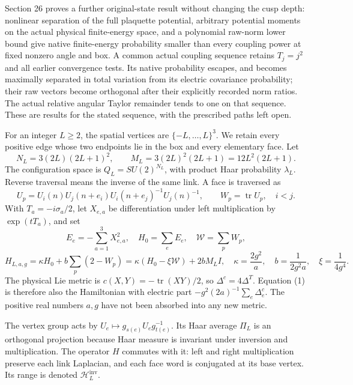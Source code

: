 \documentclass[
  11pt,
]{article}
\begin{document}
Section 26 proves a further original-state result without changing the
cusp depth: nonlinear separation of the full plaquette potential,
arbitrary potential moments on the actual physical finite-energy space,
and a polynomial raw-norm lower bound give native finite-energy
probability smaller than every coupling power at fixed nonzero angle and
box. A common actual coupling sequence retains \(T_j=j^2\) and all
earlier convergence tests. Its native probability escapes, and becomes
maximally separated in total variation from its electric covariance
probability; their raw vectors become orthogonal after their explicitly
recorded norm ratios. The actual relative angular Taylor remainder tends
to one on that sequence. These are results for the stated sequence, with
the prescribed paths left open.

For an integer \(L\ge2\), the spatial vertices are
\(\{-L,\ldots,L\}^3\). We retain every positive edge whose two endpoints
lie in the box and every elementary face. Let \[
 N_L=3(2L)(2L+1)^2,
 \qquad M_L=3(2L)^2(2L+1)=12L^2(2L+1).
\] The configuration space is \(Q_L=SU(2)^{N_L}\), with product Haar
probability \(\lambda_L\). Reverse traversal means the inverse of the
same link. A face is traversed as \[
 U_p=U_i(n)U_j(n+e_i)U_i(n+e_j)^{-1}U_j(n)^{-1},
 \qquad W_p=\operatorname{tr}U_p,\quad i<j.
\] With \(T_a=-i\sigma_a/2\), let \(X_{e,a}\) be differentiation under
left multiplication by \(\exp(tT_a)\), and set \[
 E_e=-\sum_{a=1}^3X_{e,a}^2,\quad H_0=\sum_eE_e,
 \quad \mathcal W=\sum_pW_p,
\] \[
 H_{L,a,g}=\kappa H_0+b\sum_p(2-W_p)
 =\kappa(H_0-\xi\mathcal W)+2bM_L I,
\quad \kappa=\frac{2g^2}{a},\quad b=\frac1{2g^2a},\quad
 \xi=\frac1{4g^4}.
\tag{1}
\] The physical Lie metric is \(c(X,Y)=-\operatorname{tr}(XY)/2\), so
\(\Delta^c=4\Delta^T\). Equation (1) is therefore also the Hamiltonian
with electric part \(-g^2(2a)^{-1}\sum_e\Delta_e^c\). The positive real
numbers \(a,g\) have not been absorbed into any new metric.

The vertex group acts by \(U_e\mapsto g_{s(e)}U_eg_{t(e)}^{-1}\). Its
Haar average \(\Pi_L\) is an orthogonal projection because Haar measure
is invariant under inversion and multiplication. The operator \(H\)
commutes with it: left and right multiplication preserve each link
Laplacian, and each face word is conjugated at its base vertex. Its
range is denoted \(\mathcal H_L^{\mathrm{inv}}\).
\end{document}
